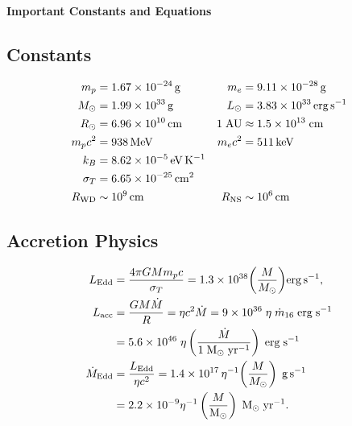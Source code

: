 \clearpage
{}
\thispagestyle{empty}
\fancyhf{}
\renewcommand{\headrulewidth}{0pt}
\begin{center}
{\Large \textbf{Important Constants and Equations}}
\end{center}
\setlength{\abovedisplayskip}{4pt}
\setlength{\belowdisplayskip}{4pt}
\begin{multicols}{2}
\setlength{\columnseprule}{0pt}
\setlength{\columnsep}{0.8cm}

\subsection*{Constants}
\footnotesize
\[
\begin{aligned}
  m_p &= 1.67\times10^{-24}\,{\rm g} &
  m_e &= 9.11\times10^{-28}\,{\rm g} \\
  M_\odot &= 1.99\times10^{33}\,{\rm g} &
  L_\odot &= 3.83\times10^{33}\,{\rm erg\,s^{-1}}\\
  R_\odot &= 6.96\times10^{10}\,{\rm cm} &
  1\;{\rm AU} &\approx 1.5 \times 10^{13}\;{\rm cm} \\
  m_p c^2 &= 938\,{\rm MeV} &
  m_e c^2 &= 511\,{\rm keV} \\
  k_B &= 8.62\times10^{-5}\,{\rm eV\,K^{-1}} \\
  \sigma_T &= 6.65\times10^{-25}\,{\rm cm^2} \\
  R_{\rm WD} &\sim 10^9\,{\rm cm} &
  R_{\rm NS} &\sim 10^6\,{\rm cm}\\
\end{aligned}
\]
\subsection*{Accretion Physics}
\footnotesize
\[
\begin{aligned}
L_{\rm Edd} &= \frac{4\pi G M m_p c}{\sigma_T}
= 1.3\times10^{38}\!\left(\frac{M}{M_\odot}\right)\!{\rm erg\,s^{-1}},\\
L_{\rm acc} &= \frac{GM\dot M}{R} = \eta c^2 \dot{M} = 9\times 10^{36} \;\eta\;\dot{m}_{16}\; {\rm erg\;s^{-1}}\\
&= 5.6\times10^{46}\;\eta \left(\frac{\dot{M}}{1\;{\rm M_\odot\;yr^{-1}}}\right) \;{\rm erg\;s^{-1}}\\
\dot M_{\rm Edd} &= \frac{L_{\rm Edd}}{\eta c^2}
= 1.4\times10^{17}\,\eta^{-1}
\!\left(\frac{M}{M_\odot}\right)\;{\rm g\,s^{-1}}\\
&= 2.2 \times 10^{-9} \eta^{-1} \left(\frac{M}{\rm M_\odot}\right)\; {\rm M_\odot \; yr^{-1}}.
\end{aligned}
\]

\end{multicols}
